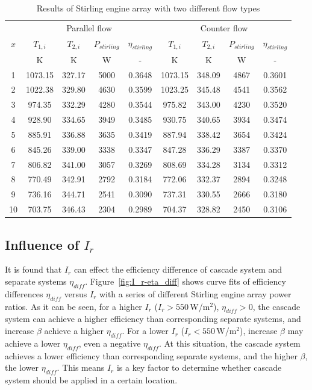 \documentclass{article}
\begin{document}
\begin{table}[htbp]
	\caption{Results of Stirling engine array with two different flow types}
	\begin{center}
	\begin{tabular}{ccccccccc}
		\toprule
		\multirow{3}{*}{$x$}	&	\multicolumn{4}{c}{Parallel flow}	&\multicolumn{4}{c}{Counter flow}\tabularnewline
		\cline{2-5}	\cline{6-9}
		&$T_{1,i}$&$T_{2,i}$&$P_{stirling}$&$\eta_{stirling}$&$T_{1,i}$&$T_{2,i}$&$P_{stirling}$&$\eta_{stirling}$\tabularnewline
		&K&K&W&-&K&K&W&-\tabularnewline
		\midrule
		1	&	1073.15	&	327.17	&	5000	&	0.3648	&	1073.15	&	348.09	&	4867	&	0.3601\\
		2	&	1022.38	&	329.80	&	4630	&	0.3599	&	1023.25	&	345.48	&	4541	&	0.3562\\
		3	&	974.35	&	332.29	&	4280	&	0.3544	&	975.82	&	343.00	&	4230	&	0.3520\\
		4	&	928.90	&	334.65	&	3949	&	0.3485	&	930.75	&	340.65	&	3934	&	0.3474\\
		5	&	885.91	&	336.88	&	3635	&	0.3419	&	887.94	&	338.42	&	3654	&	0.3424\\
		6	&	845.26	&	339.00	&	3338	&	0.3347	&	847.28	&	336.29	&	3387	&	0.3370\\
		7	&	806.82	&	341.00	&	3057	&	0.3269	&	808.69	&	334.28	&	3134	&	0.3312\\
		8	&	770.49	&	342.91	&	2792	&	0.3184	&	772.06	&	332.37	&	2894	&	0.3248\\
		9	&	736.16	&	344.71	&	2541	&	0.3090	&	737.31	&	330.55	&	2666	&	0.3180\\
		10	&	703.75	&	346.43	&	2304	&	0.2989	&	704.37	&	328.82	&	2450	&	0.3106\\
		\bottomrule
	\end{tabular}
	\end{center}
	\label{tab:SEAresults}
\end{table}

\subsection{Influence of $I_r$}

It is found that $I_r$ can effect the efficiency difference of cascade system and separate systems $\eta_{diff}$. Figure~\ref{fig:I_r-eta_diff} shows curve fits of efficiency differences $\eta_{diff}$ versus $I_r$ with a series of different Stirling engine array power ratios. As it can be seen, for a higher $I_r$ ($I_r > 550\,$W/m$^2$), $\eta_{diff}>0$, the cascade system can achieve a higher efficiency than corresponding separate systems, and increase $\beta$ achieve a higher $\eta_{diff}$. For a lower $I_r$ ($I_r < 550\,$W/m$^2$), increase $\beta$ may achieve a lower $\eta_{diff}$, even a negative $\eta_{diff}$. At this situation, the cascade system achieves a lower efficiency than corresponding separate systems, and the higher $\beta$, the lower $\eta_{diff}$. This means $I_r$ is a key factor to determine whether cascade system should be applied in a certain location.
\end{document}
